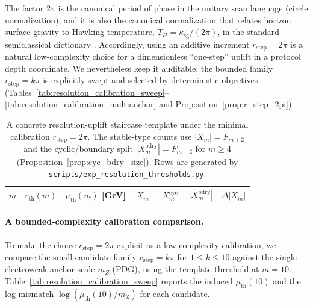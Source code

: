 \begin{remark}
The factor $2\pi$ is the canonical period of phase in the unitary scan language (circle normalization), and it is also the canonical normalization that relates horizon surface gravity to Hawking temperature, $T_H=\kappa_{\mathrm{sg}}/(2\pi)$, in the standard semiclassical dictionary \cite{Hawking1975,Wald1984}.
Accordingly, using an additive increment $r_{\mathrm{step}}=2\pi$ is a natural low-complexity choice for a dimensionless ``one-step'' uplift in a protocol depth coordinate.
We nevertheless keep it auditable: the bounded family $r_{\mathrm{step}}=k\pi$ is explicitly swept and selected by deterministic objectives (Tables~\ref{tab:resolution_calibration_sweep}--\ref{tab:resolution_calibration_multianchor} and Proposition~\ref{prop:r_step_2pi}).
\end{remark}

\begin{table}[t]
\centering
\small
\setlength{\tabcolsep}{6pt}
\renewcommand{\arraystretch}{1.15}
\begin{tabular}{rrrrrrr}
\toprule
$m$ & $r_{\mathrm{th}}(m)$ & $\mu_{\mathrm{th}}(m)$ [GeV] & $|X_m|$ & $|X_m^{\mathrm{cyc}}|$ & $|X_m^{\mathrm{bdry}}|$ & $\Delta|X_m|$ \\
\midrule
%
\end{tabular}
\caption{A concrete resolution-uplift staircase template under the minimal calibration $r_{\mathrm{step}}=2\pi$. The stable-type counts use $|X_m|=F_{m+2}$ and the cyclic/boundary split $|X_m^{\mathrm{bdry}}|=F_{m-2}$ for $m\ge 4$ (Proposition~\ref{prop:cyc_bdry_size}). Rows are generated by \texttt{scripts/exp\_resolution\_thresholds.py}.}
\label{tab:resolution_thresholds}
\end{table}

\paragraph{A bounded-complexity calibration comparison.}
To make the choice $r_{\mathrm{step}}=2\pi$ explicit as a low-complexity calibration, we compare the small candidate family $r_{\mathrm{step}}=k\pi$ for $1\le k\le 10$ against the single electroweak anchor scale $m_Z$ (PDG), using the template threshold at $m=10$.
Table~\ref{tab:resolution_calibration_sweep} reports the induced $\mu_{\mathrm{th}}(10)$ and the log mismatch $\log(\mu_{\mathrm{th}}(10)/m_Z)$ for each candidate.

